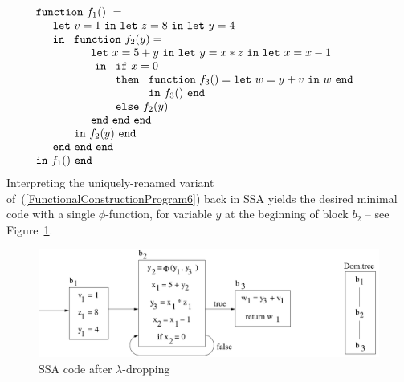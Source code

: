 \begin{equation}
\label{FunctionalConstructionProgram6}
\begin{array}{l}
\mathtt{function}\ f_1()\ = \\
  \quad
  \begin{array}{l}
     \mathtt{let}\ v = 1 \ 
     \mathtt{in\ let}\ z = 8 \ 
     \mathtt{in\ let}\ y = 4\\
     \mathtt{in}\ 
     \begin{array}[t]{l}
       \mathtt{function}\ f_2(y) =\\
         \quad
         \begin{array}{l}
           \mathtt{let}\ x = 5+y\
           \mathtt{in\ let}\ y = x*z\
           \mathtt{in\ let}\ x = x-1\\\
           \mathtt{in}\
           \begin{array}[t]{l}
             \mathtt{if}\ x=0\\ 
             \mathtt{then}\ 
               \begin{array}[t]{l}
                 \mathtt{function}\ f_3() = 
                 \mathtt{let}\ w = y+v\ \mathtt{in}\ w\ \mathtt{end}\\
                 \mathtt{in}\ f_3()\ \mathtt{end}
               \end{array}\\
             \mathtt{else}\ f_2(y)
           \end{array}\\
           \mathtt{end\ end\ end}
         \end{array}\\
     \mathtt{in}\ f_2(y)\ \mathtt{end}
     \end{array}\\
     \mathtt{end\ end\ end}\\
   \end{array}\\
\mathtt{in}\ f_1()\  \mathtt{end}
\end{array}
\end{equation}
Interpreting the uniquely-renamed variant
of~(\ref{FunctionalConstructionProgram6}) back in SSA yields the
desired minimal code with a single $\phi$-function, for variable $y$
at the beginning of block $b_2$ -- see
Figure~\ref{fig:FunctionalCorrespondenceSSAofLambdaDroppedCode}.
\begin{figure}
\begin{center}
\includegraphics[scale=0.4]{SSAConstructionExample3}
\end{center}
\caption{\label{fig:FunctionalCorrespondenceSSAofLambdaDroppedCode} SSA code after $\lambda$-dropping}
\end{figure}
